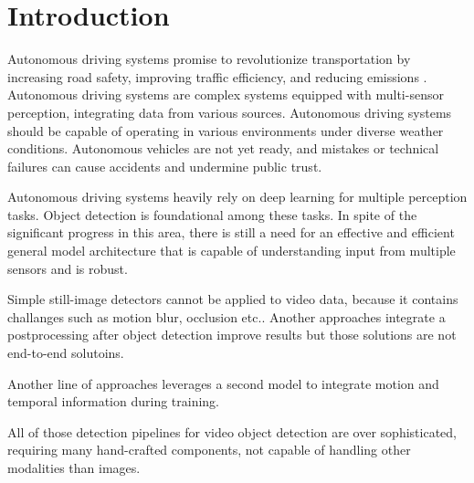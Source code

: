 \section{Introduction} \label{Introduction}

Autonomous driving systems promise to revolutionize transportation by increasing road safety, improving traffic efficiency, and reducing emissions \cite{litmanAutonomousVehicleImplementationb}.
Autonomous driving systems are complex systems equipped with multi-sensor perception, integrating data from various sources. Autonomous driving systems should be capable of operating in various environments under diverse weather conditions. Autonomous vehicles are not yet ready, and mistakes or technical failures can cause accidents and undermine public trust.

Autonomous driving systems heavily rely on deep learning for multiple perception tasks. Object detection is foundational among these tasks. In spite of the significant progress in this area, there is still a need for an effective and efficient general model architecture that is capable of understanding input from multiple sensors and is robust.


Simple still-image detectors \cite{} cannot be applied to video data, because it contains challanges such as motion blur, occlusion etc.. Another approaches \cite{hanSeqNMSVideoObject2016, kangTCNNTubeletsConvolutional2018, kangObjectDetectionVideo2016} integrate a postprocessing after object detection improve results but those solutions are not end-to-end solutoins.

Another line of approaches \cite{Lu_2017_ICCV, xiaoVideoObjectDetection2018} leverages a second model to integrate motion and temporal information during training. 



All of those detection pipelines for video object detection are over sophisticated, requiring many hand-crafted components, not capable of handling other modalities than images.


